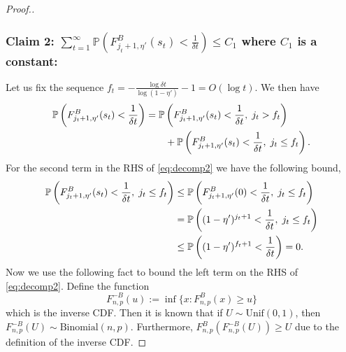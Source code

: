 \begin{proof}[Proof.]
	\subsubsection*{Claim 2: $ \sum_{t=1}^\infty \mathbb{P}\left(F^B_{j_t+1, \eta'}(s_t) < \frac{1}{\delta t}\right) \le C_1$ where $C_1$ is a constant:}
	Let us fix the sequence $f_t = -\frac{\log \delta t }{\log (1-\eta')}-1 = O(\log t)$. We then have
	\begin{align}
	\P{F^B_{j_t+1, \eta'}(s_t) < \frac{1}{\delta t}} & = \P{F^B_{j_t+1, \eta'}(s_t) < \frac{1}{\delta t}, \; j_t > f_t}  \nonumber \\
	& \qquad + \P{F^B_{j_t+1, \eta'}(s_t) < \frac{1}{\delta t}, \; j_t \le f_t} \label{eq:decomp2}.
	\end{align}
	For the second term in the RHS of \eqref{eq:decomp2} we have the following bound,
	\begin{align}
	\P{F^B_{j_t+1, \eta'}(s_t) < \frac{1}{\delta t}, \; j_t \le f_t}  &  \le \P{F^B_{j_t+1,\eta'}(0) < \frac{1}{\delta  t}, \; j_t \le f_t} \nonumber \\
	& = \P{(1-\eta')^{j_t+1} <  \frac{1}{\delta  t}, \; j_t \le f_t} \nonumber \\
	& \le \P{(1-\eta')^{f_t+1} <  \frac{1}{\delta  t}} = 0.\label{bound:bdd_by_zero}
	\end{align}
	Now we use the following fact to bound the left term on the RHS of \eqref{eq:decomp2}. Define the function
	\[
	F^{-B}_{n,p}(u) := \inf\{x : F^B_{n,p}(x) \ge u\}
	\]
	which is the inverse CDF. Then it is known that if $U \sim \text{Unif}(0,1)$, then $F^{-B}_{n,p}(U) \sim \text{Binomial}(n,p)$. Furthermore, $F^B_{n,p}(F^{-B}_{n,p}(U)) \ge U$ due to the definition of the inverse CDF.
	

\end{proof}
